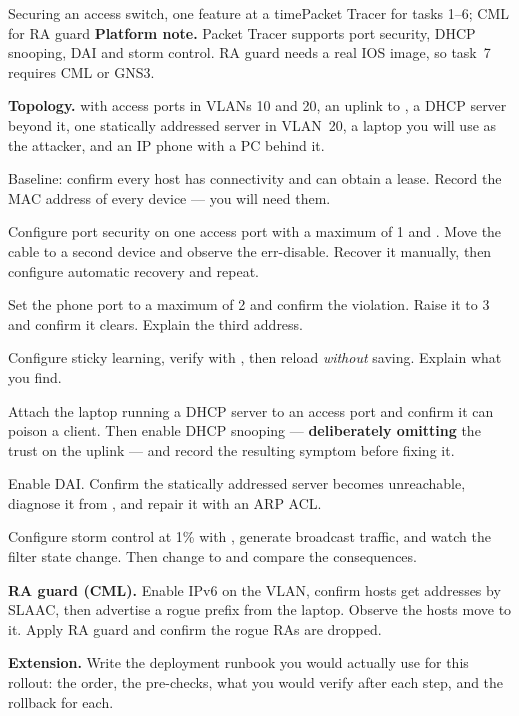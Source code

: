 \begin{lab}{Securing an access switch, one feature at a time}{Packet Tracer for tasks 1--6; CML for RA guard}
\textbf{Platform note.} Packet Tracer supports port security, DHCP snooping, DAI
and storm control. RA guard needs a real IOS image, so task~7 requires CML or
GNS3.

\textbf{Topology.}  with access ports in VLANs 10 and 20, an uplink to
, a DHCP server beyond it, one statically addressed server in VLAN~20,
a laptop you will use as the attacker, and an IP phone with a PC behind it.

\begin{tasks}
  \item Baseline: confirm every host has connectivity and can obtain a lease.
        Record the MAC address of every device --- you will need them.
  \item Configure port security on one access port with a maximum of 1 and
        . Move the cable to a second device and observe
        the err-disable. Recover it manually, then configure automatic recovery
        and repeat.
  \item Set the phone port to a maximum of 2 and confirm the violation. Raise it
        to 3 and confirm it clears. Explain the third address.
  \item Configure sticky learning, verify with
        , then reload \emph{without} saving. Explain what
        you find.
  \item Attach the laptop running a DHCP server to an access port and confirm it
        can poison a client. Then enable DHCP snooping --- \textbf{deliberately
        omitting} the trust on the uplink --- and record the resulting symptom
        before fixing it.
  \item Enable DAI. Confirm the statically addressed server becomes unreachable,
        diagnose it from , and repair it
        with an ARP ACL.
  \item Configure storm control at 1\% with , generate broadcast
        traffic, and watch the filter state change. Then change to
         and compare the consequences.
  \item \textbf{RA guard (CML).} Enable IPv6 on the VLAN, confirm hosts get
        addresses by SLAAC, then advertise a rogue prefix from the laptop.
        Observe the hosts move to it. Apply RA guard and confirm the rogue RAs
        are dropped.
  \item \textbf{Extension.} Write the deployment runbook you would actually use
        for this rollout: the order, the pre-checks, what you would verify after
        each step, and the rollback for each.
\end{tasks}
\end{lab}

